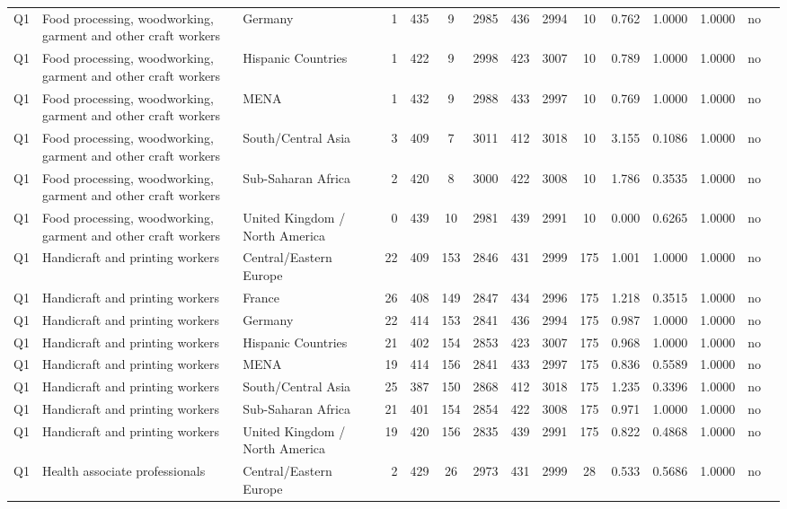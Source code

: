 \begin{longtable}{lllrcccccccccll}
Q1 & Food processing, woodworking, garment and other craft workers & Germany & 1 & 435 & 9 & 2985 & 436 & 2994 & 10 & 0.762 & 1.0000 & 1.0000 & no \\
Q1 & Food processing, woodworking, garment and other craft workers & Hispanic Countries & 1 & 422 & 9 & 2998 & 423 & 3007 & 10 & 0.789 & 1.0000 & 1.0000 & no \\
Q1 & Food processing, woodworking, garment and other craft workers & MENA & 1 & 432 & 9 & 2988 & 433 & 2997 & 10 & 0.769 & 1.0000 & 1.0000 & no \\
Q1 & Food processing, woodworking, garment and other craft workers & South/Central Asia & 3 & 409 & 7 & 3011 & 412 & 3018 & 10 & 3.155 & 0.1086 & 1.0000 & no \\
Q1 & Food processing, woodworking, garment and other craft workers & Sub-Saharan Africa & 2 & 420 & 8 & 3000 & 422 & 3008 & 10 & 1.786 & 0.3535 & 1.0000 & no \\
Q1 & Food processing, woodworking, garment and other craft workers & United Kingdom / North America & 0 & 439 & 10 & 2981 & 439 & 2991 & 10 & 0.000 & 0.6265 & 1.0000 & no \\
Q1 & Handicraft and printing workers & Central/Eastern Europe & 22 & 409 & 153 & 2846 & 431 & 2999 & 175 & 1.001 & 1.0000 & 1.0000 & no \\
Q1 & Handicraft and printing workers & France & 26 & 408 & 149 & 2847 & 434 & 2996 & 175 & 1.218 & 0.3515 & 1.0000 & no \\
Q1 & Handicraft and printing workers & Germany & 22 & 414 & 153 & 2841 & 436 & 2994 & 175 & 0.987 & 1.0000 & 1.0000 & no \\
Q1 & Handicraft and printing workers & Hispanic Countries & 21 & 402 & 154 & 2853 & 423 & 3007 & 175 & 0.968 & 1.0000 & 1.0000 & no \\
Q1 & Handicraft and printing workers & MENA & 19 & 414 & 156 & 2841 & 433 & 2997 & 175 & 0.836 & 0.5589 & 1.0000 & no \\
Q1 & Handicraft and printing workers & South/Central Asia & 25 & 387 & 150 & 2868 & 412 & 3018 & 175 & 1.235 & 0.3396 & 1.0000 & no \\
Q1 & Handicraft and printing workers & Sub-Saharan Africa & 21 & 401 & 154 & 2854 & 422 & 3008 & 175 & 0.971 & 1.0000 & 1.0000 & no \\
Q1 & Handicraft and printing workers & United Kingdom / North America & 19 & 420 & 156 & 2835 & 439 & 2991 & 175 & 0.822 & 0.4868 & 1.0000 & no \\
Q1 & Health associate professionals & Central/Eastern Europe & 2 & 429 & 26 & 2973 & 431 & 2999 & 28 & 0.533 & 0.5686 & 1.0000 & no \\

\end{longtable}
